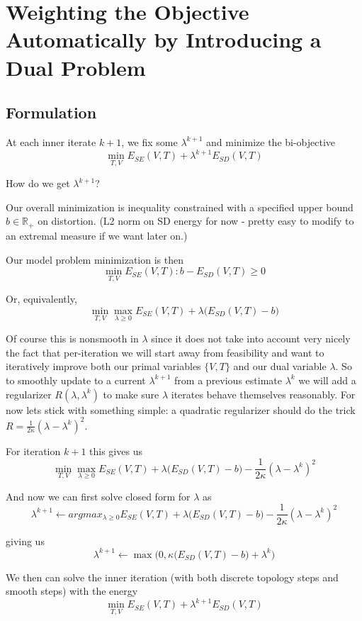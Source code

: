 \section{Weighting the Objective Automatically by Introducing a Dual Problem}

\subsection{Formulation}
At each inner iterate $k+1$, we fix some $\lambda^{k+1}$ and minimize the bi-objective 
\[ \min_{T,V} E_{SE}(V,T) + \lambda^{k+1} E_{SD}(V,T) \]

How do we get $\lambda^{k+1}$? 

Our overall minimization is inequality constrained with a specified upper bound $b \in \mathbb{R}_+$ on distortion. (L2 norm on SD  energy for now - pretty easy to modify to an extremal measure if we want later on.)

Our model problem minimization is then 
\[ \min_{T,V} E_{SE}(V,T) :  b - E_{SD}(V,T) \geq 0 \]

Or, equivalently,
\[ \min_{T,V} \max_{\lambda \geq 0} E_{SE}(V,T) + \lambda \big( E_{SD}(V,T) - b\big) \]

Of course this is nonsmooth in $\lambda$ since it does not take into account very nicely the fact that per-iteration we will start away from feasibility and want to iteratively improve both our primal variables $\{V,T\}$ and our dual variable $\lambda$.  So to smoothly update to a current $\lambda^{k+1}$ from a previous estimate $\lambda^k$ we will add a regularizer $R(\lambda,\lambda^k)$ to make sure $\lambda$ iterates behave themselves reasonably. For now lets stick with something simple: a quadratic regularizer should do the trick  $R =\frac{1}{2\kappa} (\lambda- \lambda^k)^2$. 

For iteration $k+1$ this gives us 
\[ \min_{T,V} \max_{\lambda \geq 0} E_{SE}(V,T) + \lambda \big( E_{SD}(V,T) - b\big) - \frac{1}{2\kappa} (\lambda- \lambda^k)^2 \]

And now we can first solve closed form for $\lambda$ as 
\[ \lambda^{k+1} \leftarrow argmax_{\lambda \geq 0} E_{SE}(V,T) + \lambda \big( E_{SD}(V,T) - b\big) - \frac{1}{2\kappa} (\lambda- \lambda^k)^2 \]

giving us 
\[ \lambda^{k+1} \leftarrow \max\big(0,\kappa \big( E_{SD}(V,T) -b \big) + \lambda^k\big) \]

We then can solve the inner iteration (with both discrete topology steps and smooth steps) with the energy 
\[ \min_{T,V}  E_{SE}(V,T) + \lambda^{k+1}  E_{SD}(V,T) \]


